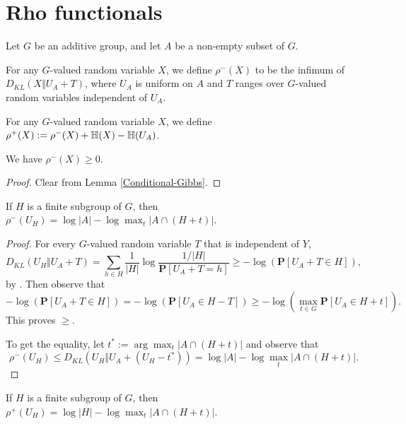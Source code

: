 \section{Rho functionals}

Let $G$ be an additive group, and let $A$ be a non-empty subset of $G$.

\begin{definition}\label{rhominus-def}  For any $G$-valued random variable $X$, we define $\rho^-(X)$ to be the infimum of $D_{KL}(X \Vert  U_A + T)$, where $U_A$ is uniform on $A$ and $T$ ranges over $G$-valued random variables independent of $U_A$.
\end{definition}

\begin{definition}\label{rhoplus-def}  For any $G$-valued random variable $X$, we define $\rho^+(X) := \rho^-(X) + \mathbb{H}(X) - \mathbb{H}(U_A)$.
\end{definition}

\begin{lemma}\label{rhominus-nonneg}  We have $\rho^-(X) \geq 0$.
\end{lemma}

\begin{proof} Clear from Lemma \ref{Conditional-Gibbs}.
\end{proof}

\begin{lemma}\label{rhominus-subgroup} If $H$ is a finite subgroup of $G$, then $\rho^-(U_H) = \log |A| - \log \max_t |A \cap (H+t)|$.
\end{lemma}

\begin{proof} 
  For every $G$-valued random variable $T$ that is independent of $Y$, 
  $$D_{KL}(U_H \Vert U_A+T) = \sum_{h\in H} \frac{1}{|H|}\log\frac{1/|H|}{\mathbf{P}[U_A+T=h]}\ge -\log(\mathbf{P}[U_A+T\in H]),$$
  by . Then observe that $$-\log(\mathbf{P}[U_A+T\in H])=-\log(\mathbf{P}[U_A\in H-T])\ge -\log(\max_{t\in G} \mathbf{P}[U_A\in H+t]).$$ This proves $\ge$. 
  
  To get the equality, let $t^*:=\arg\max_t |A \cap (H+t)|$ and observe that $$\rho^-(U_H)\le D_{KL}(U_H \Vert  U_A+(U_H-t^*))= \log |A| - \log \max_t|A \cap (H+t)|.$$
\end{proof}

\begin{corollary}\label{rhoplus-subgroup} If $H$ is a finite subgroup of $G$, then $\rho^+(U_H) = \log |H| - \log \max_t |A \cap (H+t)|$.
\end{corollary}

